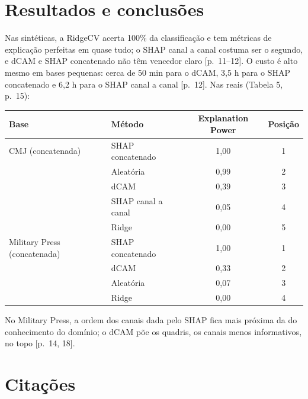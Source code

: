 \documentclass[11pt,a4paper]{article}
\begin{document}
\section{Resultados e conclusões}
Nas sintéticas, a RidgeCV acerta 100\% da classificação e tem métricas de explicação perfeitas em quase tudo; o SHAP canal a canal costuma ser o segundo, e dCAM e SHAP concatenado não têm vencedor claro [p.~11--12]. O custo é alto mesmo em bases pequenas: cerca de 50 min para o dCAM, 3,5 h para o SHAP concatenado e 6,2 h para o SHAP canal a canal [p.~12]. Nas reais (Tabela 5, p.~15):
\begin{center}\small
\begin{tabular}{llcc}
\toprule
\textbf{Base} & \textbf{Método} & \textbf{Explanation Power} & \textbf{Posição} \\
\midrule
CMJ (concatenada) & SHAP concatenado & 1,00 & 1 \\
 & Aleatória & 0,99 & 2 \\
 & dCAM & 0,39 & 3 \\
 & SHAP canal a canal & 0,05 & 4 \\
 & Ridge & 0,00 & 5 \\
\midrule
Military Press (concatenada) & SHAP concatenado & 1,00 & 1 \\
 & dCAM & 0,33 & 2 \\
 & Aleatória & 0,07 & 3 \\
 & Ridge & 0,00 & 4 \\
\bottomrule
\end{tabular}
\end{center}
No Military Press, a ordem dos canais dada pelo SHAP fica mais próxima da do conhecimento do domínio; o dCAM põe os quadris, os canais menos informativos, no topo [p.~14, 18].

\section{Citações}
\end{document}
